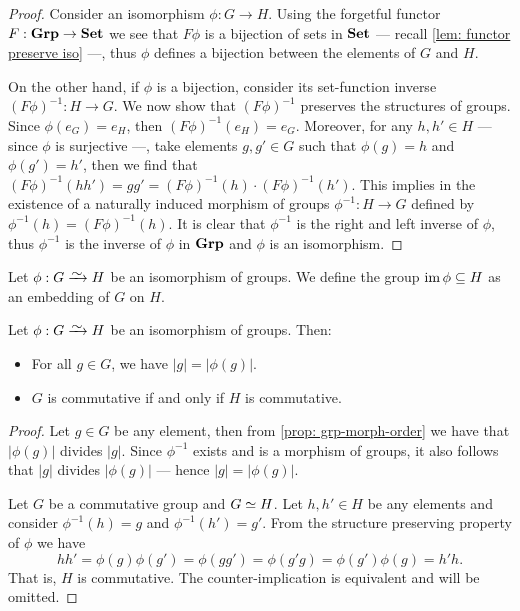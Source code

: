 \begin{proof}
Consider an isomorphism \(\phi: G \to H\). Using the forgetful functor \(F:
{\textbf{Grp}} \to {\textbf{Set}}\) we see that \(F\phi\) is a bijection of sets in \({\textbf{Set}}\) ---
recall \cref{lem: functor preserve iso} ---, thus \(\phi\) defines a bijection
between the elements of \(G\) and \(H\).

On the other hand, if \(\phi\) is a bijection, consider its set-function
inverse \({(F\phi)}^{-1}: H \to G\). We now show that \({(F\phi)}^{-1}\) preserves
the structures of groups. Since \(\phi(e_G) = e_H\), then \({(F\phi)}^{-1}(e_H)
= e_G\). Moreover, for any \(h, h' \in H\) --- since \(\phi\) is surjective
---, take elements \(g, g' \in G\) such that \(\phi(g) = h\) and \(\phi(g') =
h'\), then we find that \({(F\phi)}^{-1}(hh') = g g' = {(F\phi)}^{-1}(h) \cdot
{(F\phi)}^{-1}(h')\). This implies in the existence of a naturally induced
morphism of groups \(\phi^{-1}: H \to G\) defined by \(\phi^{-1}(h) =
{(F\phi)}^{-1}(h)\). It is clear that \(\phi^{-1}\) is the right and left
inverse of \(\phi\), thus \(\phi^{-1}\) is the inverse of \(\phi\) in \({\textbf{Grp}}\)
and \(\phi\) is an isomorphism.
\end{proof}

\begin{definition}[Embedding]
\label{def:grp-embedding}
Let \(\phi: G \isoto H\) be an isomorphism of groups. We define the group \(\operatorname{im}
\phi \subseteq H\) as an embedding of \(G\) on \(H\).
\end{definition}

\begin{proposition}\label{prop: iso-order-com}
Let \(\phi: G \isoto H\) be an isomorphism of groups. Then:
\begin{itemize}
  \setlength\itemsep{0em}
  \item For all \(g \in G\), we have \(|g| = |\phi(g)|\).
  \item \(G\) is commutative if and only if \(H\) is commutative.
\end{itemize}
\end{proposition}

\begin{proof}
Let \(g \in G\) be any element, then from \cref{prop: grp-morph-order} we have
that \(|\phi(g)|\) divides \(|g|\). Since \(\phi^{-1}\) exists and is a
morphism of groups, it also follows that \(|g|\) divides \(|\phi(g)|\) ---
hence \(|g| = |\phi(g)|\).

Let \(G\) be a commutative group and \(G \simeq H\). Let \(h, h' \in H\) be any
elements and consider \(\phi^{-1}(h) = g\) and \(\phi^{-1}(h') = g'\). From
the structure preserving property of \(\phi\) we have
\[
  h h' = \phi(g) \phi(g') = \phi(gg') = \phi(g'g) = \phi(g')\phi(g) = h' h.
\]
That is, \(H\) is commutative. The counter-implication is equivalent and will
be omitted.
\end{proof}

